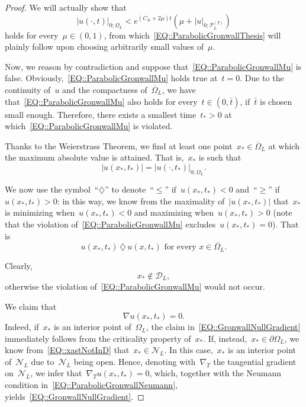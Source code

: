 \documentclass[12pt,a4paper]{amsart}
\numberwithin{equation}{section}
\theoremstyle{definition}
\theoremstyle{remark}
\newcommand{\abs}[1]{\left\lvert#1\right\rvert}
\renewcommand{\le}{\leqslant}
\renewcommand{\ge}{\geqslant}
\begin{document}
\begin{proof}
    We will actually show that
    \begin{equation}\label{EQ::ParabolicGronwallMu}
        \abs{u(\cdot, t)}_{0; \Omega_L} < e^{\left(C_\# + 2\mu \right) t} \left(\mu + \abs{u}_{0; \mathcal{P}_L^{(T)}}\right)
    \end{equation}
    holds for every~$\mu \in (0,1)$, from which~\eqref{EQ::ParabolicGronwallThesis} will plainly follow upon choosing arbitrarily small values of~$\mu$.
    
    Now, we reason by contradiction and suppose that~\eqref{EQ::ParabolicGronwallMu} is false. Obviously,~\eqref{EQ::ParabolicGronwallMu} holds true at~$t=0$. Due to the continuity of~$u$ and the compactness of~$\overline{\Omega}_L$, we have that~\eqref{EQ::ParabolicGronwallMu} also holds for every~$t \in (0,\bar{t})$, if~$\bar{t}$ is chosen small enough. Therefore, there exists a smallest time~$t_\ast > 0$ at which~\eqref{EQ::ParabolicGronwallMu} is violated.

    Thanks to the Weierstrass Theorem, we find at least one point~$x_\ast \in \overline{\Omega}_L$ at which the maximum absolute value is attained. That is,~$x_\ast$ is such that
    \begin{equation}\label{EQ::xAstAbsoluteMaximality}
        \abs{u(x_\ast, t_\ast)} = \abs{u(\cdot, t_\ast)}_{0; \Omega_L}.
    \end{equation}

    We now use the symbol~``$\diamondsuit$'' to denote~``$\le$'' if~$u(x_\ast,t_\ast)<0$ and~``$\ge$'' if~$u(x_\ast,t_\ast)>0$: in this way, we know from the maximality of~$|u(x_\ast,t_\ast)|$ that~$x_\ast$ is minimizing when~$u(x_\ast,t_\ast)<0$ and maximizing when~$u(x_\ast,t_\ast)>0$ (note that the violation of~\eqref{EQ::ParabolicGronwallMu} excludes~$u(x_\ast, t_\ast) = 0$). That is
    \begin{equation}\label{EQ::xAstMaximality}
        u(x_\ast, t_\ast) \,\diamondsuit\, u(x,t_\ast) \text{ for every } x \in \overline{\Omega}_L.
    \end{equation}

    Clearly, 
    \begin{equation}\label{EQ::xastNotInD}
        x_\ast \notin \mathcal{D}_L,
    \end{equation}
    otherwise the violation of~\eqref{EQ::ParabolicGronwallMu} would not occur.
    
    We claim that
    \begin{equation}\label{EQ::GronwallNullGradient}
        \nabla u(x_\ast,t_\ast) = 0.
    \end{equation}
    Indeed, if~$x_\ast$ is an interior point of~$\Omega_L$, the claim in~\eqref{EQ::GronwallNullGradient} immediately follows from the criticality property of~$x_\ast$. If, instead,~$x_\ast \in \partial\Omega_L$, we know from~\eqref{EQ::xastNotInD} that~$x_\ast\in\mathcal{N}_L$. In this case,~$x_\ast$ is an interior point of~$\mathcal{N}_L$ due to~$\mathcal{N}_L$ being open. Hence, denoting with~$\nabla_T$ the tangential gradient on~$\mathcal{N}_L$, we infer that~$\nabla_T u(x_\ast, t_\ast) = 0$, which, together with the Neumann condition in~\eqref{EQ::ParabolicGronwallNeumann}, yields~\eqref{EQ::GronwallNullGradient}.


\end{proof}
\end{document}
